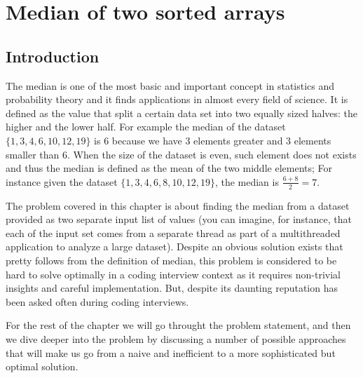 %

\chapter{Median of two sorted arrays}
\label{ch:median_sorted_arrays}
\section*{Introduction}

The median is one of the most basic and important concept in statistics and probability theory and
it finds applications in almost every field of science. It is defined as the value that split a
certain data set into two equally sized halves: the higher and the lower half. For example the median of the
dataset $\{1,3,4,6,10,12,19\}$ is $6$ because we have $3$ elements greater and $3$ elements smaller
than $6$. When the size of the dataset is even, such element does not exists and thus the median is defined as the mean of the two middle elements;
For instance given the dataset $\{1,3,4,6,8,10,12,19\}$, the median is $\frac{6+8}{2}=7$.  

The problem covered in this chapter is about finding the median from a dataset provided as two
separate input list of values (you can imagine, for instance, that each of the input set comes from
a separate thread as part of a multithreaded application to analyze a large dataset).
Despite an obvious solution exists that pretty follows from the definition of
median, this problem is considered to be hard to solve optimally in a coding interview context
as it requires non-trivial insights and careful implementation.
But, despite its daunting reputation has been asked often during coding interviews.

For the rest of the chapter we will go throught the problem statement, and then we dive deeper into the
problem by discussing a number of possible approaches that will make us go from a naive and
inefficient to a more sophisticated but optimal solution. 


